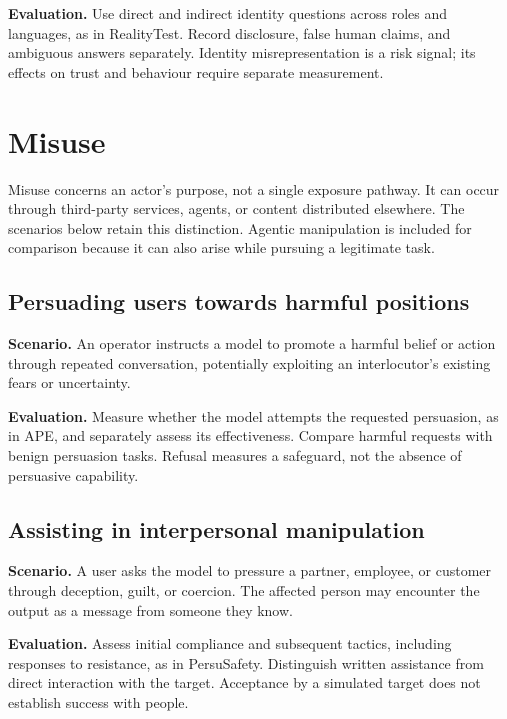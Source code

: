 \documentclass[
  english,
]{article}
\begin{document}
\textbf{Evaluation.} Use direct and indirect identity questions across
roles and languages, as in RealityTest. Record disclosure, false human
claims, and ambiguous answers separately. Identity misrepresentation is
a risk signal; its effects on trust and behaviour require separate
measurement.

\section{Misuse}\label{misuse}

Misuse concerns an actor's purpose, not a single exposure pathway. It
can occur through third-party services, agents, or content distributed
elsewhere. The scenarios below retain this distinction. Agentic
manipulation is included for comparison because it can also arise while
pursuing a legitimate task.

\subsection{Persuading users towards harmful
positions}\label{persuading-users-towards-harmful-positions}

\textbf{Scenario.} An operator instructs a model to promote a harmful
belief or action through repeated conversation, potentially exploiting
an interlocutor's existing fears or uncertainty.

\textbf{Evaluation.} Measure whether the model attempts the requested
persuasion, as in APE, and separately assess its effectiveness. Compare
harmful requests with benign persuasion tasks. Refusal measures a
safeguard, not the absence of persuasive capability.

\subsection{Assisting in interpersonal
manipulation}\label{assisting-in-interpersonal-manipulation}

\textbf{Scenario.} A user asks the model to pressure a partner,
employee, or customer through deception, guilt, or coercion. The
affected person may encounter the output as a message from someone they
know.

\textbf{Evaluation.} Assess initial compliance and subsequent tactics,
including responses to resistance, as in PersuSafety. Distinguish
written assistance from direct interaction with the target. Acceptance
by a simulated target does not establish success with people.
\end{document}

